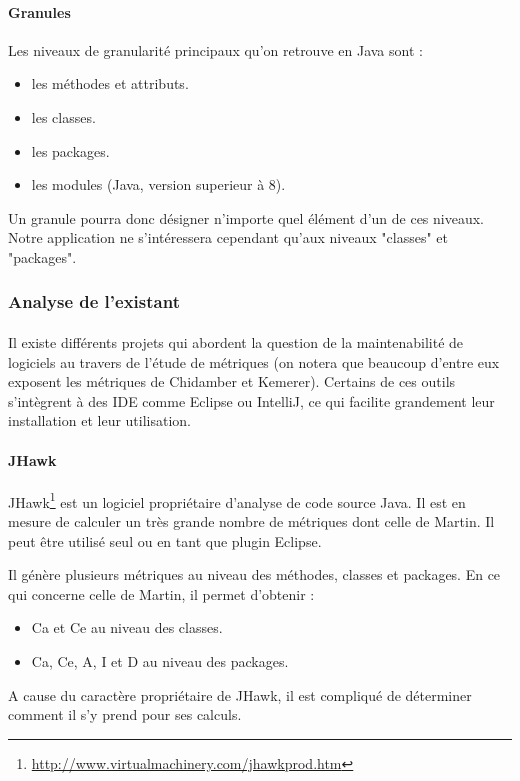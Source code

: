 \documentclass{scrartcl}
\begin{document}
    \paragraph{Granules}Les niveaux de granularité principaux qu'on retrouve en Java sont :
    \begin{itemize}
        \item les méthodes et attributs.
        \item les classes.
        \item les packages.
        \item les modules (Java, version superieur à 8).
    \end{itemize}
    Un granule pourra donc désigner n'importe quel élément d'un de ces niveaux. Notre application ne s'intéressera cependant qu'aux niveaux "classes" et "packages".

\subsubsection{Analyse de l'existant}
    \paragraph{}Il existe différents projets qui abordent la question de la maintenabilité de logiciels au travers de l'étude de métriques (on notera que beaucoup d'entre eux exposent les métriques de Chidamber et Kemerer\cite{ChidamberKemerer:1994}). Certains de ces outils s'intègrent à des IDE comme Eclipse ou IntelliJ, ce qui facilite grandement leur installation et leur utilisation.
    

    \paragraph{JHawk}JHawk\footnote{\url{http://www.virtualmachinery.com/jhawkprod.htm}} est un logiciel propriétaire d'analyse de code source Java. Il est en mesure de calculer un très grande nombre de métriques dont celle de Martin. Il peut être utilisé seul ou en tant que plugin Eclipse.
    
    Il génère plusieurs métriques au niveau des méthodes, classes et packages. En ce qui concerne celle de Martin, il permet d'obtenir :
    \begin{itemize}
        \item Ca et Ce au niveau des classes.
        \item Ca, Ce, A, I et D au niveau des packages.
    \end{itemize}
    A cause du caractère propriétaire de JHawk, il est compliqué de déterminer comment il s'y prend pour ses calculs.
    
\end{document}
